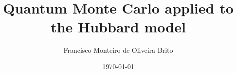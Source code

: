 \documentclass[10pt]{article}
\begin{document}
\title{Quantum Monte Carlo applied to the Hubbard model}
\author{Francisco Monteiro de Oliveira Brito}
\date{\today}
\maketitle

\begin{abstract}

\end{abstract}
\end{document}
